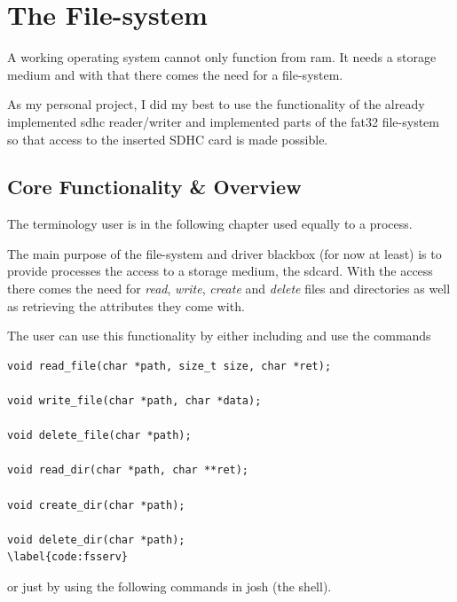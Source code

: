 \section{The File-system}\label{filesystem}

A working operating system cannot only function from ram. It needs a storage medium and with that there comes the need for a file-system. 

As my personal project, I did my best to use the functionality of the already implemented sdhc reader/writer and implemented parts of the fat32 file-system so that access to the inserted SDHC card is made possible. 

\subsection{Core Functionality \& Overview}
The terminology user is in the following chapter used equally to a process. 

The main purpose of the file-system and driver blackbox (for now at least) is to provide processes the access to a storage medium, the sdcard. With the access there comes the need for \emph{read}, \emph{write}, \emph{create} and \emph{delete} files and directories as well as retrieving the attributes they come with. 

The user can use this functionality by either including  and use the commands 

\begin{mdframed}[style=myframe]
\begin{verbatim}
void read_file(char *path, size_t size, char *ret);

void write_file(char *path, char *data);

void delete_file(char *path);

void read_dir(char *path, char **ret);

void create_dir(char *path);

void delete_dir(char *path);
\label{code:fsserv}
\end{verbatim}
\end{mdframed}

or just by using the following commands in josh (the shell). 

\begin{mdframed}[style=shell]





\end{mdframed}

